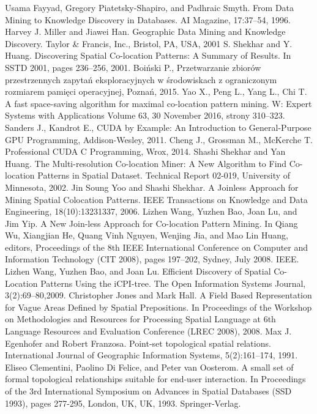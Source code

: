 \documentclass[12pt]{article}
\begin{document}
\begin{thebibliography}{}
Usama Fayyad, Gregory Piatetsky-Shapiro, and Padhraic Smyth. From Data Mining to Knowledge Discovery in Databases. AI Magazine, 17:37–54, 1996.
 Harvey J. Miller and Jiawei Han. Geographic Data Mining and Knowledge Discovery.
Taylor \& Francis, Inc., Bristol, PA, USA, 2001
 S. Shekhar and Y. Huang. Discovering Spatial Co-location Patterns: A Summary of Results. In SSTD 2001, pages 236–256, 2001.
 Boiński P., Przetwarzanie zbiorów przestrzennych zapytań eksploracyjnych w środowiskach z ograniczonym rozmiarem pamięci operacyjnej, Poznań, 2015.
Yao X., Peng L., Yang L., Chi T. A fast space-saving algorithm for maximal co-location pattern mining. W: Expert Systems with Applications Volume 63, 30 November 2016, strony 310–323.
Sanders J., Kandrot E., CUDA by Example: An Introduction to General-Purpose GPU Programming, Addison-Wesley, 2011.
Cheng J., Grossman M., McKerche T. Professional CUDA C Programming, Wrox, 2014.
Shashi Shekhar and Yan Huang. The Multi-resolution Co-location Miner: A New Algorithm to Find Co-location Patterns in Spatial Dataset. Technical Report 02-019, University of Minnesota, 2002.
Jin Soung Yoo and Shashi Shekhar. A Joinless Approach for Mining Spatial Colocation Patterns. IEEE Transactions on Knowledge and Data Engineering, 18(10):13231337, 2006.
Lizhen Wang, Yuzhen Bao, Joan Lu, and Jim Yip. A New Join-less Approach for Co-location Pattern Mining. In Qiang Wu, Xiangjian He, Quang Vinh Nguyen, Wenjing Jia, and Mao Lin Huang, editors, Proceedings of the 8th IEEE International
Conference on Computer and Information Technology (CIT 2008), pages 197–202, Sydney, July 2008. IEEE.
Lizhen Wang, Yuzhen Bao, and Joan Lu. Efficient Discovery of Spatial Co-Location Patterns Using the iCPI-tree. The Open Information Systems Journal, 3(2):69–80,2009.
Christopher Jones and Mark Hall. A Field Based Representation for Vague Areas Defined by Spatial Prepositions. In Proceedings of the Workshop on Methodologies and Resources for Processing Spatial Language at 6th Language Resources and Evaluation Conference (LREC 2008), 2008.
Max J. Egenhofer and Robert Franzosa. Point-set topological spatial relations. International Journal of Geographic Information Systems, 5(2):161–174, 1991.
 Eliseo Clementini, Paolino Di Felice, and Peter van Oosterom. A small set of formal topological relationships suitable for end-user interaction. In Proceedings of the 3rd International Symposium on Advances in Spatial Databases (SSD 1993), pages 277-295, London, UK, UK, 1993. Springer-Verlag.

\end{thebibliography}
\end{document}
